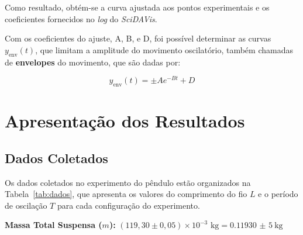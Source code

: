 \documentclass[12pt,a4paper]{article}
\begin{document}
Como resultado, obtém-se a curva ajustada aos pontos experimentais e os coeficientes fornecidos no \textit{log} do \textit{SciDAVis}.

Com os coeficientes do ajuste, A, B, e D, foi possível determinar as curvas $y_{\mathrm{env}}(t)$, que limitam a amplitude do movimento oscilatório, também chamadas de \textbf{envelopes} do movimento, que são dadas por:

\begin{equation}
    y_{\mathrm{env}}(t) = \pm Ae^{-Bt} + D
    \label{eq:envelope}
\end{equation}

\section{Apresentação dos Resultados}

\subsection{Dados Coletados}
Os dados coletados no experimento do pêndulo estão organizados na Tabela~\ref{tab:dados}, que apresenta os valores do comprimento do fio $L$ e o período de oscilação $T$ para cada configuração do experimento.

\textbf{Massa Total Suspensa ($m$):} $(119,30 \pm 0,05) \times 10^{-3} \text{ kg} = \SI{0,11930(5)}{\kilo\gram}$
\end{document}
